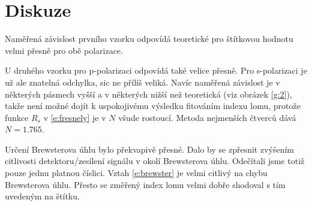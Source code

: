 \section*{Diskuze}
Naměřená závislost prvního vzorku odpovídá teoretické pro štítkovou hodnotu velmi přesně pro obě polarizace.

U druhého vzorku pro p-polarizaci odpovídá také velice přesně. Pro s-polarizaci je už ale znatelná odchylka, sic ne přílíš veliká. Navíc naměřená závislost je v některých pásmech vyšší a v některých nižší než teoretická (viz obrázek \ref{g:2}), takže není možné dojít k uspokojivému výsledku fitováním indexu lomu, protože funkce $R_s$ v \eqref{e:fresnely} je v $N$ všude rostoucí. Metoda nejmenších čtverců dává $N = \num{1.765}$.


Určení Brewsterova úhlu bylo překvapivě přesné. Dalo by se zpřesnit zvýšením citlivosti detektoru/zesílení signálu v okolí Brewsterova úhlu. Odečítali jsme totiž pouze jednu platnou číslici. Vztah \eqref{e:brewster} je velmi citlivý na chybu Brewsterova úhlu. Přesto se změřený index lomu velmi dobře shodoval s tím uvedeným na štítku.